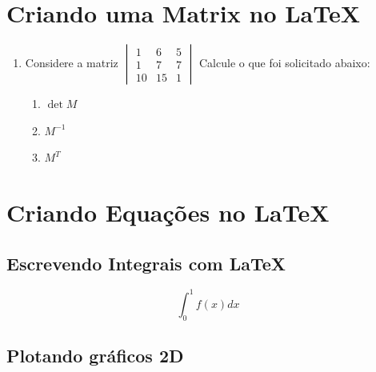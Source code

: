 \documentclass[a4paper,12pt]{article}
\begin{document}
\newpage


\section{Criando uma Matrix no \LaTeX}
\begin{enumerate}
\item Considere a matriz
$
\begin{vmatrix}
    1 & 6 & 5 \\
    1 & 7 & 7 \\
    10 & 15 & 1

\end{vmatrix}
$ Calcule o que foi solicitado abaixo:
\begin{enumerate}
    \item $\det M$
    \item $M^{-1}$
    \item $M^T$
\end{enumerate}

\end{enumerate}

\section{Criando Equações no \LaTeX}
\subsection{Escrevendo Integrais com \LaTeX}

\begin{equation}
    \int_0^1 f(x)dx
\end{equation}

\subsection{Plotando gráficos 2D}
\end{document}

